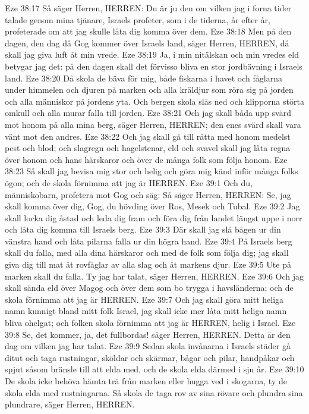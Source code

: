 Eze 38:17  Så säger Herren, HERREN: Du är ju den om vilken jag i forna tider talade genom mina tjänare, Israels profeter, som i de tiderna, år efter år, profeterade om att jag skulle låta dig komma över dem.
Eze 38:18  Men på den dagen, den dag då Gog kommer över Israels land, säger Herren, HERREN, då skall jag giva luft åt min vrede.
Eze 38:19  Ja, i min nitälskan och min vredes eld betygar jag det: på den dagen skall det förvisso bliva en stor jordbävning i Israels land.
Eze 38:20  Då skola de bäva för mig, både fiskarna i havet och fåglarna under himmelen och djuren på marken och alla kräldjur som röra sig på jorden och alla människor på jordens yta. Och bergen skola slås ned och klipporna störta omkull och alla murar falla till jorden.
Eze 38:21  Och jag skall båda upp svärd mot honom på alla mina berg, säger Herren, HERREN; den enes svärd skall vara vänt mot den andres.
Eze 38:22  Och jag skall gå till rätta med honom medelst pest och blod; och slagregn och hagelstenar, eld och svavel skall jag låta regna över honom och hans härskaror och över de många folk som följa honom.
Eze 38:23  Så skall jag bevisa mig stor och helig och göra mig känd inför många folks ögon; och de skola förnimma att jag är HERREN.
Eze 39:1  Och du, människobarn, profetera mot Gog och säg: Så säger Herren, HERREN: Se, jag skall komma över dig, Gog, du hövding över Ros, Mesek och Tubal.
Eze 39:2  Jag skall locka dig åstad och leda dig fram och föra dig från landet längst uppe i norr och låta dig komma till Israels berg.
Eze 39:3  Där skall jag slå bågen ur din vänstra hand och låta pilarna falla ur din högra hand.
Eze 39:4  På Israels berg skall du falla, med alla dina härskaror och med de folk som följa dig; jag skall giva dig till mat åt rovfåglar av alla slag och åt markens djur.
Eze 39:5  Ute på marken skall du falla. Ty jag har talat, säger Herren, HERREN.
Eze 39:6  Och jag skall sända eld över Magog och över dem som bo trygga i havsländerna; och de skola förnimma att jag är HERREN.
Eze 39:7  Och jag skall göra mitt heliga namn kunnigt bland mitt folk Israel, jag skall icke mer låta mitt heliga namn bliva ohelgat; och folken skola förnimma att jag är HERREN, helig i Israel.
Eze 39:8  Se, det kommer, ja, det fullbordas! säger Herren, HERREN. Detta är den dag om vilken jag har talat.
Eze 39:9  Sedan skola invånarna i Israels städer gå ditut och taga rustningar, sköldar och skärmar, bågar och pilar, handpåkar och spjut såsom bränsle till att elda med, och de skola elda därmed i sju år.
Eze 39:10  De skola icke behöva hämta trä från marken eller hugga ved i skogarna, ty de skola elda med rustningarna. Så skola de taga rov av sina rövare och plundra sina plundrare, säger Herren, HERREN.
